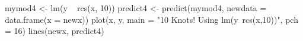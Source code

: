 \begin{Schunk}
\begin{Sinput}
 mymod4 <- lm(y ~ rcs(x, 10))
 predict4 <- predict(mymod4, newdata = data.frame(x = newx))
 plot(x, y, main = "10 Knots! Using lm(y~rcs(x,10))", pch = 16)
 lines(newx, predict4)
\end{Sinput}
\end{Schunk}
